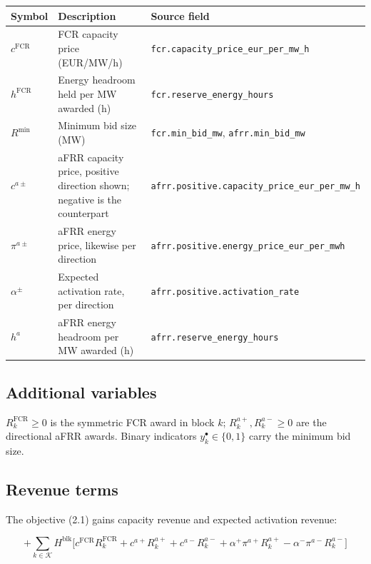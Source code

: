 \documentclass[11pt,a4paper]{article}
\numberwithin{equation}{section}
\begin{document}
\small
\begin{tabular}{@{}l >{\raggedright\arraybackslash}p{6.0cm} >{\raggedright\arraybackslash}p{6.6cm}@{}}
\toprule
Symbol & Description & Source field \\
\midrule
$c^{\text{FCR}}$      & FCR capacity price (EUR/MW/h) & \nolinkurl{fcr.capacity_price_eur_per_mw_h} \\
$h^{\text{FCR}}$      & Energy headroom held per MW awarded (h) & \nolinkurl{fcr.reserve_energy_hours} \\
$R^{\min}$            & Minimum bid size (MW) & \nolinkurl{fcr.min_bid_mw}, \nolinkurl{afrr.min_bid_mw} \\
$c^{a\pm}$            & aFRR capacity price, positive direction shown; negative is the counterpart & \nolinkurl{afrr.positive.capacity_price_eur_per_mw_h} \\
$\pi^{a\pm}$          & aFRR energy price, likewise per direction & \nolinkurl{afrr.positive.energy_price_eur_per_mwh} \\
$\alpha^{\pm}$        & Expected activation rate, per direction & \nolinkurl{afrr.positive.activation_rate} \\
$h^{a}$               & aFRR energy headroom per MW awarded (h) & \nolinkurl{afrr.reserve_energy_hours} \\
\bottomrule
\end{tabular}
\normalsize

\subsection{Additional variables}

$R^{\text{FCR}}_{k} \ge 0$ is the symmetric FCR award in block $k$;
$R^{a+}_{k}, R^{a-}_{k} \ge 0$ are the directional aFRR awards. Binary
indicators $y^{\bullet}_{k} \in \{0,1\}$ carry the minimum bid size.

\subsection{Revenue terms}

The objective (2.1) gains capacity revenue and expected activation revenue:

\begin{equation}
+ \sum_{k \in \mathcal{K}} H^{\text{blk}}
  \Big[ c^{\text{FCR}} R^{\text{FCR}}_{k}
      + c^{a+} R^{a+}_{k} + c^{a-} R^{a-}_{k}
      + \alpha^{+} \pi^{a+} R^{a+}_{k}
      - \alpha^{-} \pi^{a-} R^{a-}_{k} \Big]
\end{equation}
\end{document}
